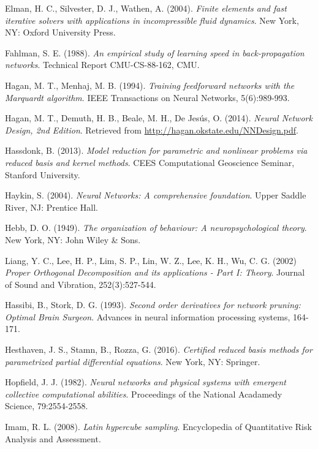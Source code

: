 \documentclass[12pt, a4paper, twoside, openright]{report}
\numberwithin{equation}{chapter}
\theoremstyle{theorem}
\theoremstyle{definition}
\theoremstyle{remark}
\theoremstyle{proposition}
\numberwithin{figure}{chapter}
\begin{document}
\begin{thebibliography}{50}
		Elman, H. C., Silvester, D. J., Wathen, A. (2004). \emph{Finite elements and fast iterative solvers with applications in incompressible fluid dynamics}. New York, NY: Oxford University Press.
		
		Fahlman, S. E. (1988). \emph{An empirical study of learning speed in back-propagation networks}. Technical Report CMU-CS-88-162, CMU.
		
		Hagan, M. T., Menhaj, M. B. (1994). \emph{Training feedforward networks with the Marquardt algorithm}. IEEE Transactions on Neural Networks, 5(6):989-993.
		
		Hagan, M. T., Demuth, H. B., Beale, M. H., De Jes\'us, O. (2014). \emph{Neural Network Design, 2nd Edition}. Retrieved from \url{http://hagan.okstate.edu/NNDesign.pdf}.
		
		Hassdonk, B. (2013). \emph{Model reduction for parametric and nonlinear problems via reduced basis and kernel methods}. CEES Computational Geoscience Seminar, Stanford University.
		
		Haykin, S. (2004). \emph{Neural Networks: A comprehensive foundation}. Upper Saddle River, NJ: Prentice Hall.
		
		Hebb, D. O. (1949). \emph{The organization of behaviour: A neuropsychological theory}. New York, NY: John Wiley \& Sons. 
		
		Liang, Y. C., Lee, H. P., Lim, S. P., Lin, W. Z., Lee, K. H., Wu, C. G. (2002) \emph{Proper Orthogonal Decomposition and its applications - Part I: Theory}. Journal of Sound and Vibration, 252(3):527-544.
		
		Hassibi, B., Stork, D. G. (1993). \emph{Second order derivatives for network pruning: Optimal Brain Surgeon}. Advances in neural information processing systems, 164-171.
		
		Hesthaven, J. S., Stamn, B., Rozza, G. (2016). \emph{Certified reduced basis methods for parametrized partial differential equations}. New York, NY: Springer.
		
		Hopfield, J. J. (1982). \emph{Neural networks and physical systems with emergent collective computational abilities}. Proceedings of the National Acadamedy Science, 79:2554-2558.
		
		Imam, R. L. (2008). \emph{Latin hypercube sampling}. Encyclopedia of Quantitative Risk Analysis and Assessment.
		

\end{thebibliography}
\end{document}
